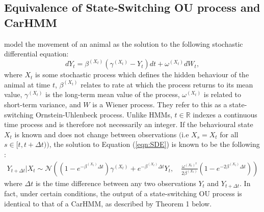 
\subsection{Equivalence of State-Switching OU process and CarHMM}

\citet{Michelot:2019} model the movement of an animal as the solution to the following stochastic differential equation:
%
\begin{equation}
    \label{eqn:SDE}
    dY_t = \beta^{(X_t)}(\gamma^{(X_t)} - Y_t)dt + \omega^{(X_t)} dW_t,
\end{equation}
%
where $X_t$ is some stochastic process which defines the hidden behaviour of the animal at time $t$, $\beta^{(X_t)}$ relates to rate at which the process returns to its mean value, $\gamma^{(X_t)}$ is the long-term mean value of the process, $\omega^{(X_t)}$ is related to short-term variance, and $W$ is a Wiener process. They refer to this as a state-switching Ornstein-Uhlenbeck process. Unlike HMMs, $t \in \mathbb{R}$ indexes a continuous time process and is therefore not necessarily an integer. If the behavioural state $X_t$ is known and does not change between observations $\Big($i.e $X_s = X_t$ for all $s \in [t,t+\Delta t)\Big)$, the solution to Equation (\ref{eqn:SDE}) is known to be the following \citep{Michelot:2019}:
%
\begin{align}
    Y_{t+\Delta t} | X_{t} \sim \mathcal{N}\left((1-e^{-\beta^{(X_t)}\Delta t})\gamma^{(X_t)} + e^{-\beta^{(X_t)}\Delta t} Y_t,\quad \frac{\omega^{(X_t)^2}}{2\beta^{(X_t)}} (1-e^{-2\beta^{(X_t)}\Delta t})\right)
    \label{eqn:OU_sol}
\end{align}
%
where $\Delta t$ is the time difference between any two observations $Y_t$ and $Y_{t+\Delta t}$. In fact, under certain conditions, the output of a state-switching OU process is identical to that of a CarHMM, as described by Theorem 1 below.


